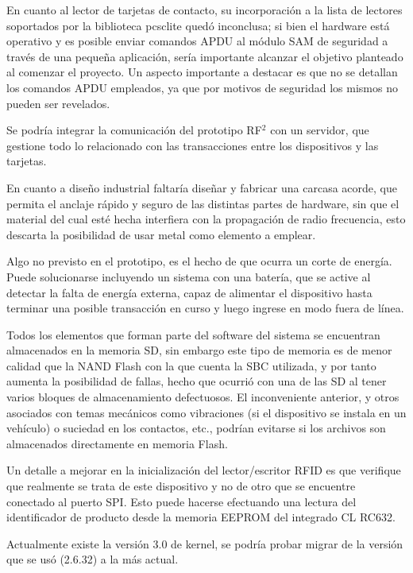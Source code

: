 \bigskip
En cuanto al lector de tarjetas de contacto, su incorporación a la lista
de lectores soportados por la biblioteca pcsclite quedó inconclusa; si 
bien el hardware está operativo y es posible enviar comandos APDU al 
módulo SAM de seguridad a través de una pequeña aplicación, sería 
importante alcanzar el objetivo planteado al comenzar el proyecto.
Un aspecto importante a destacar es que no se detallan los comandos
APDU empleados, ya que por motivos de seguridad los mismos no pueden 
ser revelados.

\bigskip
Se podría integrar la comunicación del prototipo RF$^{2}$ con un servidor, 
que gestione todo lo relacionado con las transacciones entre los dispositivos 
y las tarjetas.

\bigskip
 En cuanto a diseño industrial faltaría diseñar y fabricar una 
carcasa acorde, que permita el anclaje rápido y seguro de las distintas
partes de hardware, sin que el material del cual esté hecha interfiera
con la propagación de radio frecuencia, esto descarta la posibilidad de
usar metal como elemento a emplear.

\bigskip
Algo no previsto en el prototipo, es el hecho de que ocurra un corte de energía. Puede
solucionarse incluyendo un sistema con una batería, que se active al detectar la falta de 
energía externa, capaz de alimentar el dispositivo hasta terminar una posible transacción en 
curso y luego ingrese en modo fuera de línea.

\bigskip
Todos los elementos que forman parte del software del sistema se encuentran almacenados
en la memoria SD, sin embargo este tipo de memoria es de menor calidad que la NAND Flash
con la que cuenta la SBC utilizada, y por tanto aumenta la posibilidad de fallas, hecho que 
ocurrió con una de las SD al tener varios bloques de almacenamiento defectuosos. El 
inconveniente anterior, y otros asociados con temas mecánicos como vibraciones (si el 
dispositivo se instala en un vehículo) o suciedad en los contactos, etc., podrían evitarse 
si los archivos son almacenados directamente en memoria Flash.

\bigskip
Un detalle a mejorar en la inicialización del lector/escritor RFID es que verifique
que realmente se trata de este dispositivo y no de otro que se encuentre conectado
al puerto SPI. Esto puede hacerse efectuando una lectura del identificador de producto
desde la memoria EEPROM del integrado CL RC632.

\bigskip
Actualmente existe la versión 3.0 de kernel, se podría probar migrar de la versión que se usó (2.6.32) a la más actual.


